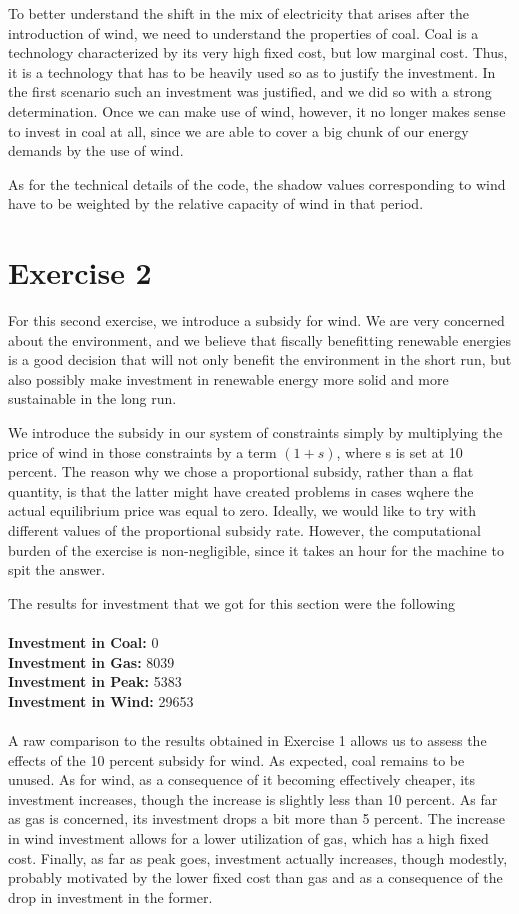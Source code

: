 \documentclass[12 pt]{article}
\begin{document}
To better understand the shift in the mix of electricity that arises after the introduction of wind, we need to understand the properties of coal. Coal is a technology characterized by its very high fixed cost, but low marginal cost. Thus, it is a technology that has to be heavily used so as to justify the investment. In the first scenario such an investment was justified, and we did so with a strong determination. Once we can make use of wind, however, it no longer makes sense to invest in coal at all, since we are able to cover a big chunk of our energy demands by the use of wind.

As for the technical details of the code, the shadow values corresponding to wind have to be weighted by the relative capacity of wind in that period. 

\section*{Exercise 2}

For this second exercise, we introduce a subsidy for wind. We are very concerned about the environment, and we believe that fiscally benefitting renewable energies is a good decision that will not only benefit the environment in the short run, but also possibly make investment in renewable energy more solid and more sustainable in the long run.

We introduce the subsidy in our system of constraints simply by multiplying the price of wind in those constraints by a term $(1+s)$, where s is set at 10 percent. The reason why we chose a proportional subsidy, rather than a flat quantity, is that the latter might have created problems in cases wqhere the actual equilibrium price was equal to zero. Ideally, we would like to try with different values of the proportional subsidy rate. However, the computational burden of the exercise is non-negligible, since it takes an hour for the machine to spit the answer. 

The results for investment that we got for this section were the following \\
\\
\textbf{Investment in Coal:} 0 \\
\textbf{Investment in Gas:}  8039  \\
\textbf{Investment in Peak:} 5383 \\
\textbf{Investment in Wind:} 29653 \\
\\

A raw comparison to the results obtained in Exercise 1 allows us to assess the effects of the 10 percent subsidy for wind. As expected, coal remains to be unused. As for wind, as a consequence of it becoming effectively cheaper, its investment increases, though the increase is slightly less than 10 percent. As far as gas is concerned, its investment drops a bit more than 5 percent. The increase in wind investment allows for a lower utilization of gas, which has a high fixed cost. Finally, as far as peak goes, investment actually increases, though modestly, probably motivated by the lower fixed cost than gas and as a consequence of the drop in investment in the former.
\end{document}
